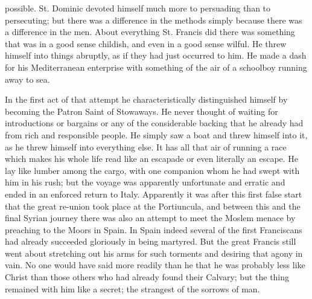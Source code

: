 \documentclass{book}
\begin{document}
possible. St. Dominic devoted himself much more to persuading than to persecuting; but there was a difference in the methods simply because there was a difference in the men. About everything St. Francis did there was something that was in a good sense childish, and even in a good sense wilful. He threw himself into things abruptly, as if they had just occurred to him. He made a dash for his Mediterranean enterprise with something of the air of a schoolboy running away to sea.

In the first act of that attempt he characteristically distinguished himself by becoming the Patron Saint of Stowaways. He never thought of waiting for introductions or bargains or any of the considerable backing that he already had from rich and responsible people. He simply saw a boat and threw himself into it, as he threw himself into everything else. It has all that air of running a race which makes his whole life read like an escapade or even literally an escape. He lay like lumber among the cargo, with one companion whom he had swept with him in his rush; but the voyage was apparently unfortunate and erratic and ended in an enforced return to Italy. Apparently it was after this first false start that the great re-union took place at the Portiuncula, and between this and the final Syrian journey there was also an attempt to meet the Moslem menace by preaching to the Moors in Spain. In Spain indeed several of the first Franciscans had already succeeded gloriously in being martyred. But the great Francis still went about stretching out his arms for such torments and desiring that agony in vain. No one would have said more readily than he that he was probably less like Christ than those others who had already found their Calvary; but the thing remained with him like a secret; the strangest of the sorrows of man.
\end{document}
